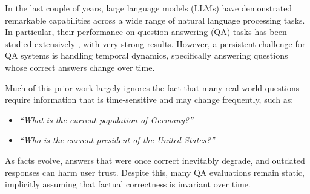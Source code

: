 In the last couple of years, large language models (LLMs) have demonstrated remarkable capabilities across a wide range of natural language processing tasks. In particular, their performance on question answering (QA) tasks has been studied extensively \cite{fischer2024questionlargelanguagemodels,brown2020languagemodelsfewshotlearners}, with very strong results. However, a persistent challenge for QA systems is handling temporal dynamics, specifically answering questions whose correct answers change over time.

Much of this prior work largely ignores the fact that many real-world questions require information that is time-sensitive and may change frequently, such as:
\begin{itemize}
  \setlength{\itemsep}{1pt}
  \setlength{\parskip}{1pt}
  \setlength{\parsep}{1pt}
  \setlength{\topsep}{1pt}
  \item \textit{\enquote{What is the current population of Germany?}}
  \item \textit{\enquote{Who is the current president of the United States?}}
\end{itemize}
As facts evolve, answers that were once correct inevitably degrade, and outdated responses can harm user trust. Despite this, many QA evaluations remain static, implicitly assuming that factual correctness is invariant over time.

